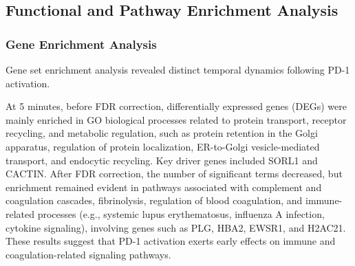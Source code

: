 \documentclass{article}
\begin{document}
    \subsection{Functional and Pathway Enrichment Analysis}

      \subsubsection{Gene Enrichment Analysis}
      
        Gene set enrichment analysis revealed distinct temporal dynamics following PD-1 activation.

        At 5 minutes, before FDR correction, differentially expressed genes (DEGs) were mainly enriched in GO biological processes related to protein transport, receptor recycling, and metabolic regulation, such as protein retention in the Golgi apparatus, regulation of protein localization, ER-to-Golgi vesicle-mediated transport, and endocytic recycling. Key driver genes included SORL1 and CACTIN. After FDR correction, the number of significant terms decreased, but enrichment remained evident in pathways associated with complement and coagulation cascades, fibrinolysis, regulation of blood coagulation, and immune-related processes (e.g., systemic lupus erythematosus, influenza A infection, cytokine signaling), involving genes such as PLG, HBA2, EWSR1, and H2AC21. These results suggest that PD-1 activation exerts early effects on immune and coagulation-related signaling pathways.
\end{document}
